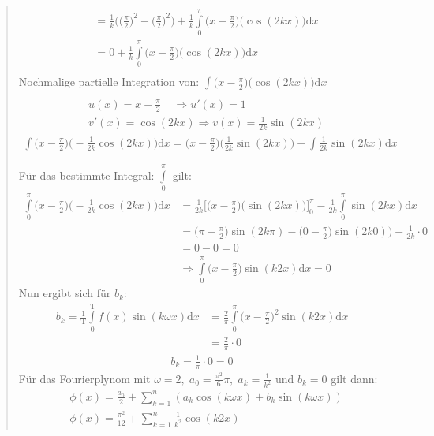 \begin{quote}
\begin{align*}
&=\frac{1}{k}\bigg(\bigg(\frac{\pi}{2}\bigg)^2-\bigg(\frac{\pi}{2}\bigg)^2\bigg)+\frac{1}{k}\int\limits_{0}^{\pi} \bigg(x-\frac{\pi}{2}\bigg)\bigg(\cos(2kx)\bigg)\mathrm{d}x\\
&=0+\frac{1}{k}\int\limits_{0}^{\pi} \bigg(x-\frac{\pi}{2}\bigg)\bigg(\cos(2kx)\bigg)\mathrm{d}x\\
\end{align*}
Nochmalige partielle Integration von: $ \int\limits_{}^{} \big(x-\frac{\pi}{2}\big)\big(\cos(2kx)\big)\mathrm{d}x $
\begin{align*}
&u(x)=x-\frac{\pi}{2}\;\;\;\;\Rightarrow u'(x)=1\\
&v'(x)=\cos(2kx)\Rightarrow v(x)=\frac{1}{2k}\sin(2kx)
\end{align*}
\begin{align*}
\int\limits_{}^{} \bigg(x-\frac{\pi}{2}\bigg)\bigg(-\frac{1}{2k}\cos(2kx)\bigg)\mathrm{d}x=\bigg(x-\frac{\pi}{2}\bigg)\bigg(\frac{1}{2k}\sin(2kx)\bigg)-\int\limits_{}^{} \frac{1}{2k}\sin(2kx)\mathrm{d}x\\
\end{align*}
Für das bestimmte Integral: $ \int\limits_{0}^{\pi}  $ gilt:\\
\begin{align*}
\int\limits_{0}^{\pi} \bigg(x-\frac{\pi}{2}\bigg)\bigg(-\frac{1}{2k}\cos(2kx)\bigg)\mathrm{d}x
&=\frac{1}{2k}\bigg[\bigg(x-\frac{\pi}{2}\bigg)\bigg(\sin(2kx)\bigg)\bigg]^\pi_0-\frac{1}{2k}\int\limits_{0}^{\pi} \sin(2kx)\mathrm{d}x\\
&=\bigg(\pi-\frac{\pi}{2}\bigg) \sin(2k\pi)-\bigg(0-\frac{\pi}{2}\bigg)\sin(2k 0)\bigg)-\frac{1}{2k}\cdot 0\\
&=0-0=0\\
&\Rightarrow \int\limits_{0}^{\pi} \bigg(x-\frac{\pi}{2}\bigg)\sin(k2x)\mathrm{d}x=0
\end{align*}
Nun ergibt sich für $ b_k $:\\
\begin{align*}
b_k=\frac{1}{\mathrm{T}}\int\limits_{0}^{\mathrm{T}}f(x) \sin(k\omega x)\mathrm{d}x&=\frac{2}{\pi}\int\limits_{0}^{\pi} \bigg(x-\frac{\pi}{2}\bigg)^2\sin(k2x)\mathrm{d}x\\
&=\frac{2}{\pi}\cdot 0
\end{align*}
\begin{align*}
b_k=\frac{1}{\pi}\cdot 0 =0
\end{align*}
Für das Fourierplynom mit $ \omega =2,\; a_0=\frac{\pi^2}{6}\pi, \;a_k=\frac{1}{k^2} $ und $ b_k=0 $ gilt dann:\\
\begin{align*}
&\phi(x)=\frac{a_0}{2}+\sum\limits_{k=1}^{n}(a_k\cos(k\omega x)+b_k\sin(k\omega x))\\
&\phi(x)=\frac{\pi^2}{12}+\sum\limits_{k=1}^{n}\frac{1}{k^2}\cos(k2x)
\end{align*}
\end{quote}
